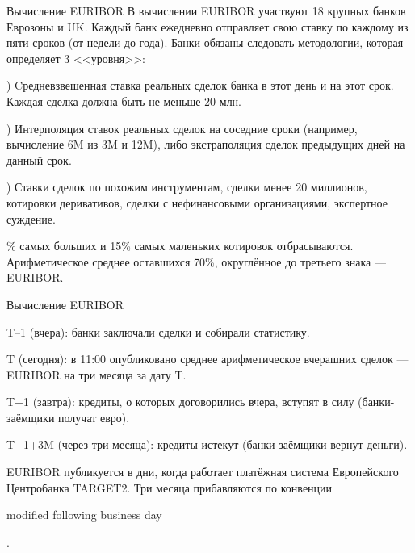 \documentclass{beamer}
\newcommand{\en}[1]{\begin{otherlanguage}{english}#1\end{otherlanguage}}
\begin{document}
\begin{frame}{Вычисление EURIBOR}
\justify
В вычислении EURIBOR участвуют 18 крупных банков Еврозоны и UK. Каждый банк ежедневно отправляет свою ставку по каждому из пяти сроков (от недели до года). Банки обязаны следовать методологии, которая определяет 3 <<уровня>>:

) Cредневзвешенная ставка реальных сделок банка в этот день и на этот срок. Каждая сделка должна быть не меньше 20 млн.

) Интерполяция ставок реальных сделок на соседние сроки (например, вычисление 6M из 3M и 12M), либо экстраполяция сделок предыдущих дней на данный срок.

) Ставки сделок по похожим инструментам, сделки менее 20 миллионов, котировки деривативов, сделки с нефинансовыми организациями, экспертное суждение. 

\% самых больших и 15\% самых маленьких котировок отбрасываются. Арифметическое среднее оставшихся 70\%, округлённое до третьего знака --- EURIBOR.
\end{frame}



\begin{frame}{Вычисление EURIBOR}
\centering
{}
	
\justify
T--1 (вчера):  банки заключали сделки и собирали статистику.

T (сегодня): в 11:00 опубликовано среднее арифметическое вчерашних сделок --- EURIBOR на три месяца за дату T.

T+1 (завтра): кредиты, о которых договорились вчера, вступят в силу (банки-заёмщики получат евро).

T+1+3M (через три месяца): кредиты истекут (банки-заёмщики вернут деньги).

\justify
EURIBOR публикуется в дни, когда работает платёжная система Европейского Центробанка TARGET2. Три месяца прибавляются по конвенции \en{modified following business day}.
\end{frame}
\end{document}
